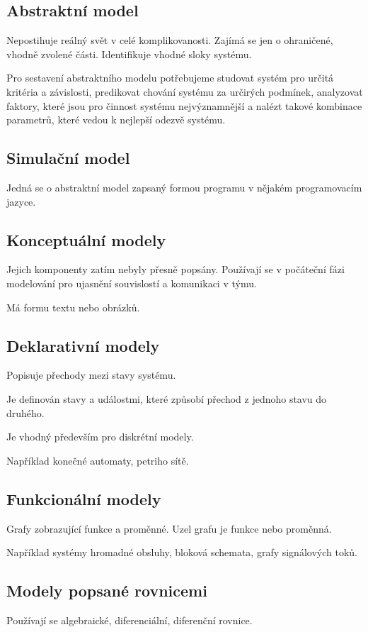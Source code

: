 \documentclass[11pt]{article}
\begin{document}
\subsection{Abstraktní model}
\label{sec:org9d2a4cc}
Nepostihuje reálný svět v celé komplikovanosti. Zajímá se jen o ohraničené,
vhodně zvolené části. Identifikuje vhodné sloky systému.

Pro sestavení abstraktního modelu potřebujeme studovat systém pro určitá
kritéria a závislosti, predikovat chování systému za určirých podmínek,
analyzovat faktory, které jsou pro činnost systému nejvýznamnější a nalézt
takové kombinace parametrů, které vedou k nejlepší odezvě systému.

\subsection{Simulační model}
\label{sec:org9e82f0b}
Jedná se o abstraktní model zapsaný formou programu v nějakém programovacím
jazyce.

\subsection{Konceptuální modely}
\label{sec:org5571070}
Jejich komponenty zatím nebyly přesně popsány. Používají se v počáteční fázi
modelování pro ujasnění souvislostí a komunikaci v týmu.

Má formu textu nebo obrázků.

\subsection{Deklarativní modely}
\label{sec:org075d155}
Popisuje přechody mezi stavy systému.

Je definován stavy a událostmi, které způsobí přechod z jednoho stavu do
druhého.

Je vhodný především pro diskrétní modely.

Například konečné automaty, petriho sítě.

\subsection{Funkcionální modely}
\label{sec:org98377c2}
Grafy zobrazující funkce a proměnné. Uzel grafu je funkce nebo proměnná.

Například systémy hromadné obsluhy, bloková schemata, grafy signálových toků.

\subsection{Modely popsané rovnicemi}
\label{sec:org9b01199}
Používají se algebraické, diferenciální, diferenční rovnice.
\end{document}
